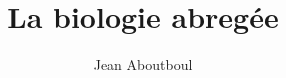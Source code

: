 \documentclass[a4paper, twoside]{report}
\title{La biologie abregée}
\author{Jean Aboutboul}
\begin{document}

\newpage
\renewcommand{\headrulewidth}{0pt}
\strut
\newpage
\tableofcontents









%
%
\end{document}
